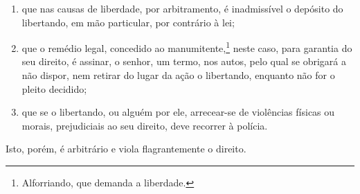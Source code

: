 \begin{enumerate}[label=\arabic*º]
\item que nas causas de liberdade, por arbitramento, é inadmissível
o depósito do libertando, em mão particular, por contrário à lei;

\item que o remédio legal, concedido ao manumitente,\footnote{
  Alforriando, que demanda a liberdade.} neste caso, para garantia do
seu direito, é assinar, o senhor, um termo, nos autos, pelo qual se
obrigará a não dispor, nem retirar do lugar da ação o libertando,
enquanto não for o pleito decidido;

\item que se o libertando, ou alguém por ele, arrecear-se de
violências físicas ou morais, prejudiciais ao seu direito, deve recorrer
à polícia.
\end{enumerate}

Isto, porém, é arbitrário e viola flagrantemente o direito.

